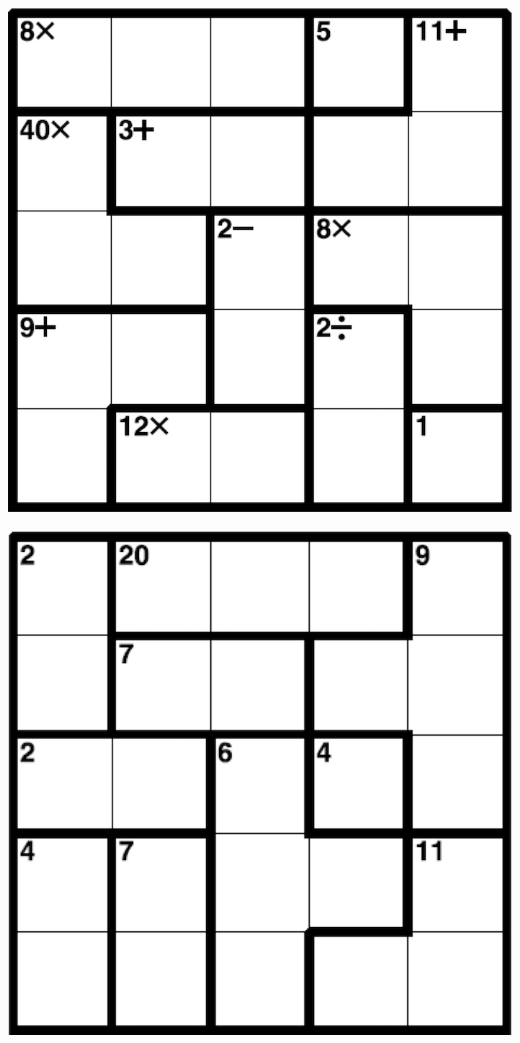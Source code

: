 
\includegraphics[scale=1]{Gambar/Lampiran/5x5_25.png}

\includegraphics[scale=1]{Gambar/Lampiran/5x5_26.png}

